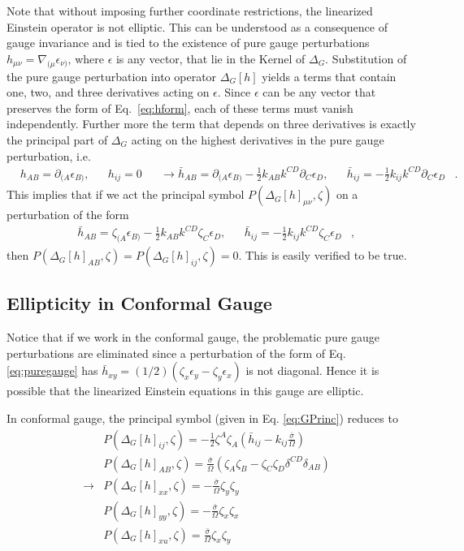 \documentclass[aps,prd,amsmath,showpacs,amssymb,superscriptaddress,nofootinbib,longbibliography,eqsecnum,preprintnumbers]{revtex4-1}
\begin{document}
Note that without imposing further coordinate restrictions, the linearized Einstein operator is not elliptic. This can be understood as a consequence of gauge invariance and is tied to the existence of pure gauge perturbations $h_{\mu \nu}=\nabla_{(\mu}\epsilon_{\nu)}$, where $\epsilon$ is any vector, that lie in the Kernel of $\Delta_G$. Substitution of the pure gauge perturbation into operator $\Delta_G[h]$ yields a terms that contain one, two, and three derivatives acting on $\epsilon$. Since $\epsilon$ can be any vector that preserves the form of Eq.~\eqref{eq:hform}, each of these terms must vanish independently. Further more the term that depends on three derivatives is exactly the principal part of $\Delta_G$ acting on the highest derivatives in the pure gauge perturbation, i.e.
\begin{align}
& h_{AB}=\partial_{(A}\epsilon_{B)},& &h_{ij}=0& &\to \bar h_{AB}=\partial_{(A}\epsilon_{B)}-\frac{1}{2}k_{AB}k^{CD}\partial_{C}\epsilon_{D},&  &\bar h_{ij}=-\frac{1}{2}k_{ij}k^{CD}\partial_{C}\epsilon_{D}&. \label{eq:puregauge}
\end{align}
This implies that if we act the principal symbol $P(\Delta_G[h]_{\mu\nu},\zeta)$ on a perturbation of the form
\begin{align}
& \bar h_{AB}=\zeta_{(A}\epsilon_{B)}-\frac{1}{2}k_{AB}k^{CD}\zeta_{C}\epsilon_{D},&  &\bar h_{ij}=-\frac{1}{2}k_{ij}k^{CD}\zeta_{C}\epsilon_{D}&, \label{eq:pg}
\end{align}
then $P(\Delta_G[h]_{AB},\zeta)=P(\Delta_G[h]_{ij},\zeta)=0$. This is easily verified to be true.


\subsection{Ellipticity in Conformal Gauge}
Notice that if we work in the conformal gauge, the problematic pure gauge perturbations are eliminated since a perturbation of the form of Eq. \eqref{eq:puregauge} has $\bar h_{xy}=(1/2)(\zeta_{x}\epsilon_y-\zeta_y\epsilon_x)$ is not diagonal. Hence it is possible that the linearized Einstein equations in this gauge are elliptic.

In conformal gauge, the principal symbol (given in Eq. \eqref{eq:GPrinc}) reduces to
\begin{align}
&P(\Delta_G[h]_{ij},\zeta)=-\frac{1}{2}\zeta^A\zeta_A\left(\bar h_{ij}-k_{ij}\frac{\bar \sigma}{\Omega}\right)& \nonumber \\
&P(\Delta_G[h]_{AB},\zeta)=\frac{\bar\sigma}{\Omega}\left(\zeta_A\zeta_B-\zeta_C\zeta_D\delta^{CD}\delta_{AB}\right)& \nonumber \\
\to &P(\Delta_G[h]_{xx},\zeta)=-\frac{\bar\sigma}{\Omega}\zeta_y\zeta_y& \nonumber \\
&P(\Delta_G[h]_{yy},\zeta)=-\frac{\bar\sigma}{\Omega}\zeta_x\zeta_x& \nonumber \\
&P(\Delta_G[h]_{xu},\zeta)=\frac{\bar\sigma}{\Omega}\zeta_x\zeta_y& \label{eq:Pconf}
\end{align}
\end{document}
